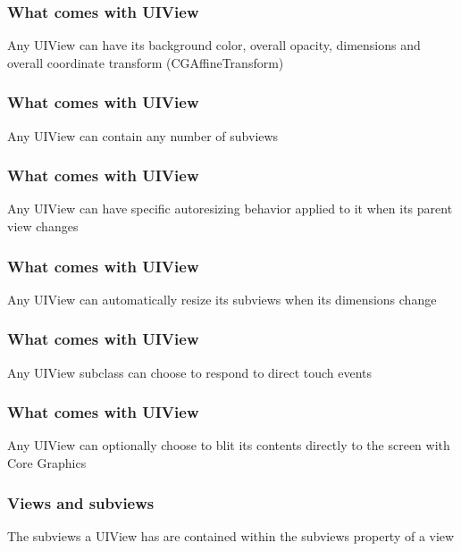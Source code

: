 \documentclass[10pt]{beamer}
\begin{document}
    
\begin{frame}[fragile]
  \frametitle{What comes with UIView}
  Any UIView can have its background color, overall opacity,  dimensions and overall coordinate transform (CGAffineTransform)

\end{frame}

\begin{frame}[fragile]
  \frametitle{What comes with UIView}
  Any UIView can contain any number of subviews

\end{frame}

\begin{frame}[fragile]
  \frametitle{What comes with UIView}
  Any UIView can have specific autoresizing behavior applied to it when its parent view changes

\end{frame}

\begin{frame}[fragile]
  \frametitle{What comes with UIView}
  Any UIView can automatically resize its subviews when its dimensions change

\end{frame}

\begin{frame}[fragile]
  \frametitle{What comes with UIView}
  Any UIView subclass can choose to respond to direct touch events

\end{frame}

\begin{frame}[fragile]
  \frametitle{What comes with UIView}
  Any UIView can optionally choose to blit its contents directly to the screen with Core Graphics

\end{frame}

    
\begin{frame}[fragile]
  \frametitle{Views and subviews}
  The subviews a UIView has are contained within the subviews property of a view

\end{frame}
\end{document}
